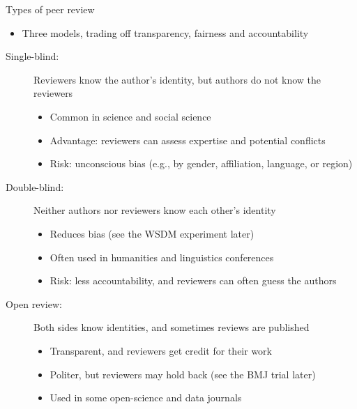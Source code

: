 \documentclass[aspectratio=169]{beamer}
\begin{document}
\begin{frame}{Types of peer review}
\begin{itemize}
  \item Three models, trading off transparency, fairness and accountability
\end{itemize}

\begin{description}
  \item[Single-blind:] Reviewers know the author's identity, but authors do not know the reviewers
    \begin{itemize}
      \item Common in science and social science
      \item Advantage: reviewers can assess expertise and potential conflicts
      \item Risk: unconscious bias (e.g., by gender, affiliation, language, or region)
    \end{itemize}

  \item[Double-blind:] Neither authors nor reviewers know each other's identity
    \begin{itemize}
      \item Reduces bias (see the WSDM experiment later)
      \item Often used in humanities and linguistics conferences
      \item Risk: less accountability, and reviewers can often guess the authors
    \end{itemize}

  \item[Open review:] Both sides know identities, and sometimes reviews are published
    \begin{itemize}
      \item Transparent, and reviewers get credit for their work
      \item Politer, but reviewers may hold back (see the BMJ trial later)
      \item Used in some open-science and data journals
    \end{itemize}
\end{description}
 \end{frame}
\end{document}
